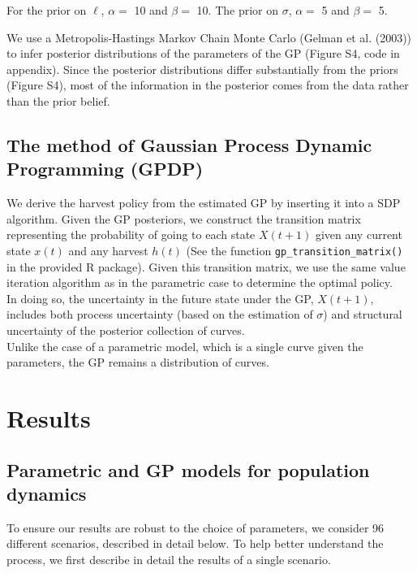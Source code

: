\documentclass[author-year, 12pt,review]{components/elsarticle} %
\begin{document}
For the prior on $\ell$, $\alpha = $ 10 and $\beta = $ 10. The prior on
$\sigma$, $\alpha = $ 5 and $\beta = $ 5.

We use a Metropolis-Hastings Markov Chain Monte Carlo (Gelman et al.
(2003)) to infer posterior distributions of the parameters of the GP
(Figure S4, code in appendix). Since the posterior distributions differ
substantially from the priors (Figure S4), most of the information in
the posterior comes from the data rather than the prior belief.

\subsection{The method of Gaussian Process Dynamic Programming
(GPDP)}\label{the-method-of-gaussian-process-dynamic-programming-gpdp}

We derive the harvest policy from the estimated GP by inserting it into
a SDP algorithm. Given the GP posteriors, we construct the transition
matrix representing the probability of going to each state $X(t+1)$
given any current state $x(t)$ and any harvest $h(t)$ (See the function
\texttt{gp\_transition\_matrix()} in the provided R package). Given this
transition matrix, we use the same value iteration algorithm as in the
parametric case to determine the optimal policy.\\In doing so, the
uncertainty in the future state under the GP, $X(t+1)$, includes both
process uncertainty (based on the estimation of $\sigma$) and structural
uncertainty of the posterior collection of curves.\\Unlike the case of a
parametric model, which is a single curve given the parameters, the GP
remains a distribution of curves.

\section{Results}\label{results}

\subsection{Parametric and GP models for population
dynamics}\label{parametric-and-gp-models-for-population-dynamics}

To ensure our results are robust to the choice of parameters, we
consider 96 different scenarios, described in detail below. To help
better understand the process, we first describe in detail the results
of a single scenario.
\end{document}
